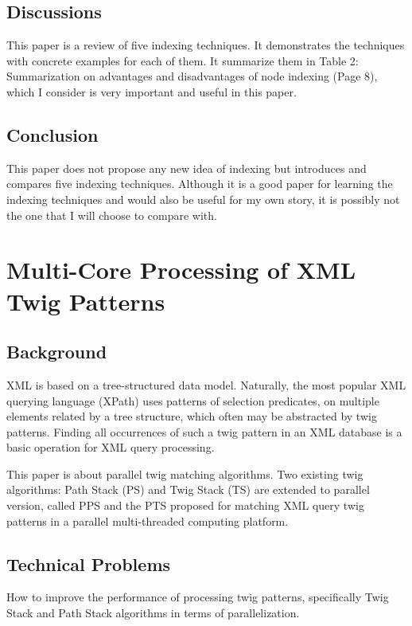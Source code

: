 \documentclass{paper}
\begin{document}
	
	\subsection{Discussions}
	
	This paper is a review of five indexing techniques. It demonstrates the
	techniques with concrete examples for each of them. It summarize them in Table
	2: Summarization on advantages and disadvantages of node indexing (Page 8),
	which I consider  is very important and useful in this paper.
	
	
	\subsection{Conclusion}
	
	This paper does not propose any new idea of indexing but introduces and compares
	five indexing techniques. Although it is a good paper for learning the indexing
	techniques and would also be useful for my own story, it is possibly not the one
	that I will choose to compare with.
	
	
	\section{Multi-Core Processing of XML Twig Patterns}
	
	\subsection{Background}
	
	XML is based on a tree-structured data model. Naturally, the most popular XML
	querying language (XPath) uses patterns of selection predicates, on multiple
	elements related by a tree structure, which often may be abstracted by twig
	patterns. Finding all occurrences of such a twig pattern in an XML database is a
	basic  operation for XML query processing. 
	
	This paper is about parallel twig matching algorithms. Two existing twig
	algorithms: Path Stack (PS) and Twig Stack (TS) are extended to parallel version,
	called PPS and the PTS proposed for matching XML query twig patterns in a
	parallel multi-threaded computing platform.
	
	\subsection{Technical Problems}
	
	How to improve the performance of processing twig patterns, specifically Twig
	Stack and Path Stack algorithms in terms of parallelization.
	
\end{document}
